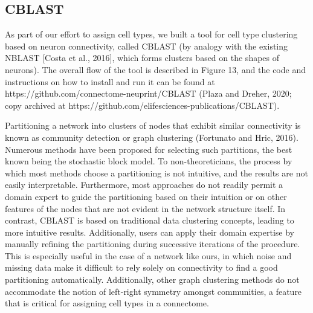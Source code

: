 \documentclass{article}
\begin{document}
\subsection*{CBLAST}

As part of our effort to assign cell types, we built a tool for cell type clustering based on neuron connectivity, called CBLAST (by analogy with the existing NBLAST [Costa et al., 2016], which forms clusters based on the shapes of neurons). The overall flow of the tool is described in Figure 13, and the code and instructions on how to install and run it can be found at https://github.com/connectome-neuprint/CBLAST (Plaza and Dreher, 2020; copy archived at https://github.com/elifesciences-publications/CBLAST).


Partitioning a network into clusters of nodes that exhibit similar connectivity is known as community detection or graph clustering (Fortunato and Hric, 2016). Numerous methods have been proposed for selecting such partitions, the best known being the stochastic block model. To non-theoreticians, the process by which most methods choose a partitioning is not intuitive, and the results are not easily interpretable. Furthermore, most approaches do not readily permit a domain expert to guide the partitioning based on their intuition or on other features of the nodes that are not evident in the network structure itself. In contrast, CBLAST is based on traditional data clustering concepts, leading to more intuitive results. Additionally, users can apply their domain expertise by manually refining the partitioning during successive iterations of the procedure. This is especially useful in the case of a network like ours, in which noise and missing data make it difficult to rely solely on connectivity to find a good partitioning automatically. Additionally, other graph clustering methods do not accommodate the notion of left-right symmetry amongst communities, a feature that is critical for assigning cell types in a connectome.
\end{document}
